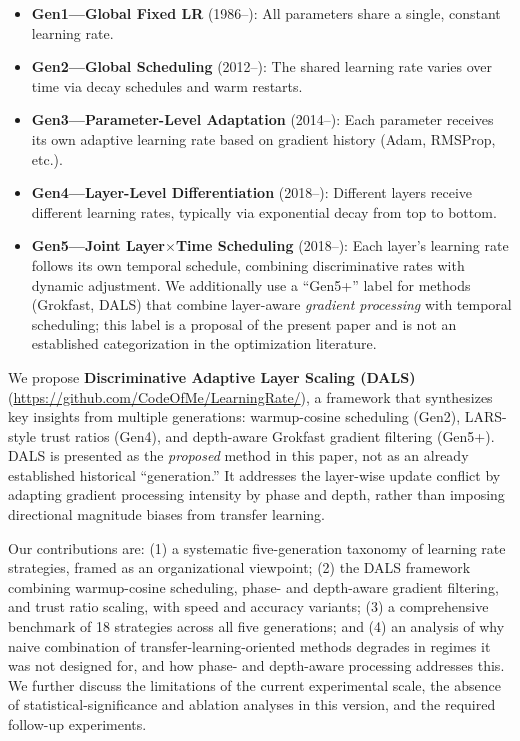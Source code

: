 \documentclass[a4paper,fleqn]{cas-dc}
\begin{document}
\begin{itemize}
\item \textbf{Gen1---Global Fixed LR} (1986--): All parameters share a single, constant learning rate.
\item \textbf{Gen2---Global Scheduling} (2012--): The shared learning rate varies over time via decay schedules and warm restarts.
\item \textbf{Gen3---Parameter-Level Adaptation} (2014--): Each parameter receives its own adaptive learning rate based on gradient history (Adam, RMSProp, etc.).
\item \textbf{Gen4---Layer-Level Differentiation} (2018--): Different layers receive different learning rates, typically via exponential decay from top to bottom.
\item \textbf{Gen5---Joint Layer$\times$Time Scheduling} (2018--): Each layer's learning rate follows its own temporal schedule, combining discriminative rates with dynamic adjustment. We additionally use a ``Gen5+'' label for methods (Grokfast, DALS) that combine layer-aware \emph{gradient processing} with temporal scheduling; this label is a proposal of the present paper and is not an established categorization in the optimization literature.
\end{itemize}

We propose \textbf{Discriminative Adaptive Layer Scaling (DALS)} (\url{https://github.com/CodeOfMe/LearningRate/}), a framework that synthesizes key insights from multiple generations: warmup-cosine scheduling (Gen2), LARS-style trust ratios (Gen4), and depth-aware Grokfast gradient filtering (Gen5+). DALS is presented as the \emph{proposed} method in this paper, not as an already established historical ``generation.'' It addresses the layer-wise update conflict by adapting gradient processing intensity by phase and depth, rather than imposing directional magnitude biases from transfer learning.

Our contributions are: (1) a systematic five-generation taxonomy of learning rate strategies, framed as an organizational viewpoint; (2) the DALS framework combining warmup-cosine scheduling, phase- and depth-aware gradient filtering, and trust ratio scaling, with speed and accuracy variants; (3) a comprehensive benchmark of 18 strategies across all five generations; and (4) an analysis of why naive combination of transfer-learning-oriented methods degrades in regimes it was not designed for, and how phase- and depth-aware processing addresses this. We further discuss the limitations of the current experimental scale, the absence of statistical-significance and ablation analyses in this version, and the required follow-up experiments.
\end{document}
